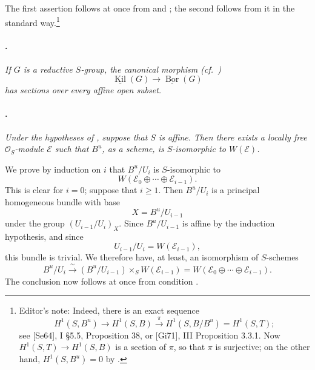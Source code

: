 The first assertion follows at once from  and ; the
second follows from it in the standard way.\footnote{Editor's note:
Indeed, there is an exact sequence
\[
  H^1(S,B^u)\longrightarrow H^1(S,B)
  \xrightarrow{\;\pi\;}H^1(S,B/B^u)=H^1(S,T);
\]
see \textup{[Se64]}, I \S5.5, Proposition 38, or
\textup{[Gi71]}, III Proposition 3.3.1. Now
\(H^1(S,T)\to H^1(S,B)\) is a section of \(\pi\), so that
\(\pi\) is surjective; on the other hand,
\(H^1(S,B^u)=0\) by .}

\paragraph{.}
{\itshape If \(G\) is a reductive \(S\)-group, the canonical
morphism \textup{(cf.\ )}
\[
  \underline{\operatorname{Kil}}(G)
  \longrightarrow
  \underline{\operatorname{Bor}}(G)
\]
has sections over every affine open subset.}

\paragraph{.}
{\itshape Under the hypotheses of , suppose that \(S\) is
affine. Then there exists a locally free \(\mathcal O_S\)-module
\(\mathcal E\) such that \(B^u\), as a scheme, is \(S\)-isomorphic
to \(W(\mathcal E)\).}

We prove by induction on \(i\) that \(B^u/U_i\) is \(S\)-isomorphic
to
\[
  W(\mathcal E_0\oplus\cdots\oplus\mathcal E_{i-1}).
\]
This is clear for \(i=0\); suppose that \(i\geq1\). Then
\(B^u/U_i\) is a principal homogeneous bundle with base
\[
  X=B^u/U_{i-1}
\]
under the group \((U_{i-1}/U_i)_X\). Since \(B^u/U_{i-1}\) is
affine by the induction hypothesis, and since
\[
  U_{i-1}/U_i=W(\mathcal E_{i-1}),
\]
this bundle is trivial. We therefore have, at least, an isomorphism
of \(S\)-schemes
\[
  B^u/U_i
  \xrightarrow{\;\sim\;}
  (B^u/U_{i-1})\times_S W(\mathcal E_{i-1})
  =
  W(\mathcal E_0\oplus\cdots\oplus\mathcal E_{i-1}).
\]
The conclusion now follows at once from condition
\textup{}.

